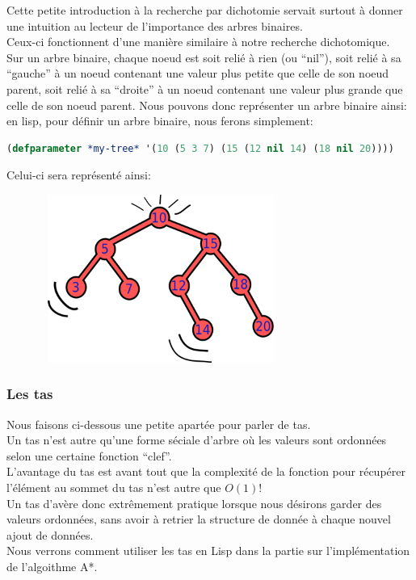\documentclass[a4paper, 12pt]{article}
\numberwithin{equation}{subsection}
\begin{document}
Cette petite introduction à la recherche par dichotomie servait surtout à donner une intuition au lecteur de l'importance des arbres binaires. \\
Ceux-ci fonctionnent d'une manière similaire à notre recherche dichotomique. \\
Sur un arbre binaire, chaque noeud est soit relié à rien (ou ``nil''), soit relié à sa ``gauche'' à un noeud contenant une valeur plus petite que celle de son noeud parent, soit relié à sa ``droite'' à un noeud contenant une valeur plus grande que celle de son noeud parent. Nous pouvons donc représenter un arbre binaire ainsi: \\[0.2cm]
en lisp, pour définir un arbre binaire, nous ferons simplement:
\begin{lstlisting}[language=Lisp]
(defparameter *my-tree* '(10 (5 3 7) (15 (12 nil 14) (18 nil 20))))
\end{lstlisting}
Celui-ci sera représenté ainsi: \\
\begin{figure}[H]
  \centering
  \includegraphics[width=8.0cm, height=5.5cm]{imgs/tree.png}
\end{figure}
\subsubsection{Les tas}
Nous faisons ci-dessous une petite apartée pour parler de tas. \\
Un tas n'est autre qu'une forme séciale d'arbre où les valeurs sont ordonnées selon une certaine fonction ``clef''. \\
L'avantage du tas est avant tout que la complexité de la fonction pour récupérer l'élément au sommet du tas n'est autre que $O(1)$! \\
Un tas d'avère donc extrêmement pratique lorsque nous désirons garder des valeurs ordonnées, sans avoir à retrier la structure de donnée à chaque nouvel ajout de données. \\
Nous verrons comment utiliser les tas en Lisp dans la partie sur l'implémentation de l'algoithme A*.
\end{document}
